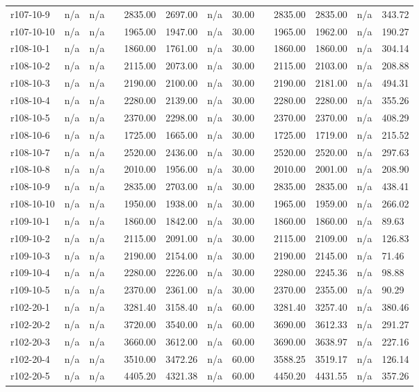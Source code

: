 \documentclass[final,5p,times,twocolumn]{elsarticle}
\begin{document}
{{{{{{{{{{{{{\begin{longtable}{l l l l l l l l l l l l l}
r107-10-9& n/a& n/a&&2835.00& 2697.00& n/a& 30.00&&2835.00& 2835.00& n/a& 343.72\\
r107-10-10& n/a& n/a&&1965.00& 1947.00& n/a& 30.00&&1965.00& 1962.00& n/a& 190.27\\
r108-10-1& n/a& n/a&&1860.00& 1761.00& n/a& 30.00&&1860.00& 1860.00& n/a& 304.14\\
r108-10-2& n/a& n/a&&2115.00& 2073.00& n/a& 30.00&&2115.00& 2103.00& n/a& 208.88\\
r108-10-3& n/a& n/a&&2190.00& 2100.00& n/a& 30.00&&2190.00& 2181.00& n/a& 494.31\\
r108-10-4& n/a& n/a&&2280.00& 2139.00& n/a& 30.00&&2280.00& 2280.00& n/a& 355.26\\
r108-10-5& n/a& n/a&&2370.00& 2298.00& n/a& 30.00&&2370.00& 2370.00& n/a& 408.29\\
r108-10-6& n/a& n/a&&1725.00& 1665.00& n/a& 30.00&&1725.00& 1719.00& n/a& 215.52\\
r108-10-7& n/a& n/a&&2520.00& 2436.00& n/a& 30.00&&2520.00& 2520.00& n/a& 297.63\\
r108-10-8& n/a& n/a&&2010.00& 1956.00& n/a& 30.00&&2010.00& 2001.00& n/a& 208.90\\
r108-10-9& n/a& n/a&&2835.00& 2703.00& n/a& 30.00&&2835.00& 2835.00& n/a& 438.41\\
r108-10-10& n/a& n/a&&1950.00& 1938.00& n/a& 30.00&&1965.00& 1959.00& n/a& 266.02\\
r109-10-1& n/a& n/a&&1860.00& 1842.00& n/a& 30.00&&1860.00& 1860.00& n/a& 89.63\\
r109-10-2& n/a& n/a&&2115.00& 2091.00& n/a& 30.00&&2115.00& 2109.00& n/a& 126.83\\
r109-10-3& n/a& n/a&&2190.00& 2154.00& n/a& 30.00&&2190.00& 2145.00& n/a& 71.46\\
r109-10-4& n/a& n/a&&2280.00& 2226.00& n/a& 30.00&&2280.00& 2245.36& n/a& 98.88\\
r109-10-5& n/a& n/a&&2370.00& 2361.00& n/a& 30.00&&2370.00& 2355.00& n/a& 90.29\\
r102-20-1& n/a& n/a&&3281.40& 3158.40& n/a& 60.00&&3281.40& 3257.40& n/a& 380.46\\
r102-20-2& n/a& n/a&&3720.00& 3540.00& n/a& 60.00&&3690.00& 3612.33& n/a& 291.27\\
r102-20-3& n/a& n/a&&3660.00& 3612.00& n/a& 60.00&&3690.00& 3638.97& n/a& 227.16\\
r102-20-4& n/a& n/a&&3510.00& 3472.26& n/a& 60.00&&3588.25& 3519.17& n/a& 126.14\\
r102-20-5& n/a& n/a&&4405.20& 4321.38& n/a& 60.00&&4450.20& 4431.55& n/a& 357.26\\

\end{longtable}}}}}}}}}}}}}}
\end{document}
